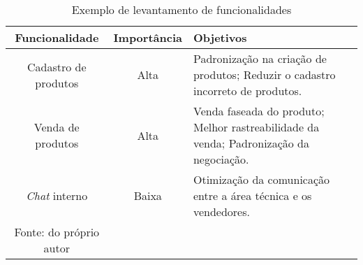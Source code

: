       \begin{table}[h!]
        \centering
        \label{Tabela:2}
        \caption{Exemplo de levantamento de funcionalidades}
        \begin{tabular}{c c p{5cm}}
          \hline
          \textbf{Funcionalidade} &
          \textbf{Importância}  &
          \textbf{Objetivos} \\ \hline
          Cadastro de produtos &
          Alta &
          Padronização na criação de produtos; \newline
          Reduzir o cadastro incorreto de produtos.
          \\
          Venda de produtos &
          Alta &
          Venda faseada do produto; \newline
          Melhor rastreabilidade da venda; \newline
          Padronização da negociação.
          \\
          \textit{Chat} interno &
          Baixa &
          Otimização da comunicação entre a área técnica e os vendedores.
          \\ \hline
          \newline
          \small{Fonte: do próprio autor}
        \end{tabular}
      \end{table}

